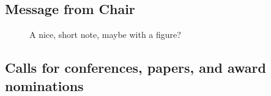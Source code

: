 \documentclass[
  letterpaper,
  DIV=11,
  numbers=noendperiod,
  oneside]{scrartcl}
\begin{document}
\hypertarget{message-from-chair}{%
\subsection{Message from Chair}\label{message-from-chair}}

\begin{figure}

\begin{minipage}[t]{0.50\linewidth}

{\centering 

A nice, short note, maybe with a figure?

}

\end{minipage}%
%
\begin{minipage}[t]{0.50\linewidth}

{\centering 


}

\end{minipage}%

\end{figure}

\hypertarget{calls-for-conferences-papers-and-award-nominations}{%
\subsection{Calls for conferences, papers, and award
nominations}\label{calls-for-conferences-papers-and-award-nominations}}
\end{document}

